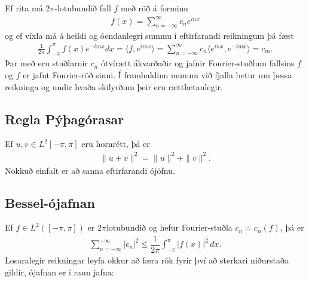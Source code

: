 \documentclass[a4paper,10pt,icelandic]{sphinxmanual}
\begin{document}
Ef rita má \(2\pi\)-lotubundið fall \(f\) með röð á forminu
\begin{equation*}
\begin{split}f(x) = \sum_{n=-\infty}^\infty c_n e^{inx}\end{split}
\end{equation*}
og ef víxla má á heildi og óendanlegri summu í eftirfarandi reikningum þá fæst
\begin{equation*}
\begin{split}\frac{1}{2\pi}\int_{-\pi}^\pi f(x) e^{-imx} dx = \langle f,e^{imx} \rangle = \sum_{n=-\infty}^\infty c_n \langle e^{inx},e^{-imx} \rangle = c_m.\end{split}
\end{equation*}
Þar með eru stuðlarnir \(c_n\) ótvírætt ákvarðaðir og jafnir Fourier-stuðlum fallsins \(f\) og \(f\) er jafnt Fourier-röð sinni. Í framhaldinu munum við fjalla betur um þessa reikninga og undir hvaða skilyrðum þeir eru rættlætanlegir.


\subsection{Regla Pýþagórasar}
\label{\detokenize{Kafli02:regla-pyagorasar}}
Ef \(u, v\in L^2[-\pi,\pi]\) eru hornrétt, þá er
\begin{equation*}
\begin{split}\| u+v\|^2 = \|u\|^2 + \| v\|^2.\end{split}
\end{equation*}
Nokkuð einfalt er að sanna eftirfarandi ójöfnu.


\subsection{Bessel-ójafnan}
\label{\detokenize{Kafli02:bessel-ojafnan}}
Ef \(f\in L^2([-\pi,\pi])\) er \(2\pi\)\textendash{}lotubundið og hefur
Fourier-stuðla \(c_n=c_n(f)\), þá er
\begin{equation*}
\begin{split}\sum\limits_{n=-\infty}^{+\infty}|c_n|^2 \leq \dfrac
 1{2\pi}\int_{-\pi}^\pi |f(x)|^2\, dx.\end{split}
\end{equation*}
Losaralegir reikningar leyfa okkur að færa rök fyrir því að sterkari niðurstaða gildir, ójafnan er í raun jafna:
\end{document}
